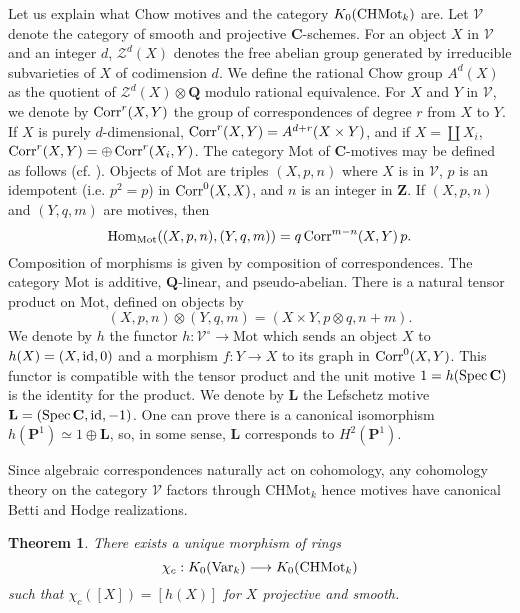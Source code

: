 \documentclass[english,12pt]{amsart}
\def\CC{{\mathbf C}}
\def\LL{{\mathbf L}}
\def\PP{{\mathbf P}}
\def\QQ{{\mathbf Q}}
\def\ZZ{{\mathbf Z}}
\def\cV{{\mathcal V}}
\def\cZ{{\mathcal Z}}
\newtheorem{theorem}[subsubsection]{Theorem}
\theoremstyle{definition}
\theoremstyle{remark}
\theoremstyle{plain}
\numberwithin{equation}{subsection}
\def\CC{{\mathbf C}}
\def\LL{{\mathbf L}}
\def\PP{{\mathbf P}}
\def\QQ{{\mathbf Q}}
\def\ZZ{{\mathbf Z}}
\def\cV{{\mathcal V}}
\def\cZ{{\mathcal Z}}
\begin{document}
Let us explain what  Chow motives and the category
$K_0 ({\rm CHMot}_k)$ are.
Let 
$\cV$ denote the category of smooth and projective $\CC$-schemes.
For  an object $X$ in $\cV$ and an integer $d$, $\cZ^{d} (X)$
denotes the free abelian group generated by irreducible subvarieties of
$X$ of codimension $d$. We define the rational Chow group
$A^{d} (X)$ as the quotient of $\cZ^{d} (X) \otimes \QQ$
modulo rational equivalence.
For $X$ and $Y$ in $\cV$,  we denote by ${\rm Corr}^{r} (X, Y)$ the
group of correspondences of degree $r$ from $X$ to $Y$. If $X$ is purely
$d$-dimensional, ${\rm Corr}^{r} (X, Y) = A^{d + r} (X \times Y)$,
and if $X = \coprod X_{i}$, 
${\rm Corr}^{r} (X, Y) = \oplus \, {\rm Corr}^{r} (X_{i}, Y)$.
The category $\textrm{Mot}$ of $\CC$-motives may be defined as follows
(cf. \cite{Scholl}).
Objects of $\textrm{Mot}$ are triples $(X, p, n)$ where $X$ is in $\cV$,
$p$ is an idempotent (i.e. $p^{2} = p$) in ${\rm Corr}^{0} (X, X)$, and
$n$ is an integer in $\ZZ$. If $(X, p, n)$
and $(Y, q, m)$ are motives, then
$$
{\rm Hom}_{\textrm{Mot}} ((X, p, n), (Y, q, m))
=
q \, {\rm Corr}^{m - n} (X, Y) \, p.
$$
Composition of morphisms is given by composition of correspondences.
The category $\textrm{Mot}$ is  additive, $\QQ$-linear, and pseudo-abelian.
There is a natural tensor product on $\textrm{Mot}$, 
defined on objects by
$$
(X, p, n) \otimes (Y, q, m) = (X \times Y, p \otimes q, n + m).
$$
We denote by $h$ the functor $h : \cV^{\circ} \rightarrow
\textrm{Mot}$ which sends an object $X$ to $h (X) = (X, {\rm id}, 0)$
and a morphism $f : Y \rightarrow X$ to its graph in
${\rm Corr}^{0} (X, Y)$. This functor is compatible with the
tensor product and the unit motive $1 = h ({\rm Spec} \, \CC)$ is the identity
for the product. We denote by ${\LL}$ the Lefschetz motive
$\LL = ({\rm Spec} \, \CC, {\rm id}, -1)$. One can prove
there is a canonical isomorphism
$h (\PP^{1}) \simeq 1 \oplus \LL$,
so, in some sense, $\LL$ corresponds to $H^{2} (\PP^{1})$.

Since algebraic correspondences naturally
act  on cohomology, any cohomology theory on the category $\cV$ factors
through $\textrm{CHMot}_k$ hence motives
have canonical Betti and Hodge realizations.




\begin{theorem}\label{MEC}There exists a unique
morphism of rings
$$
\chi_{c} :
K_{0} ({\rm Var}_k) \longrightarrow K_{0} ({\rm CHMot}_k)
$$
such that $\chi_{c} ([X]) = [h (X)]$
for $X$ projective and smooth.
\end{theorem}
\end{document}
